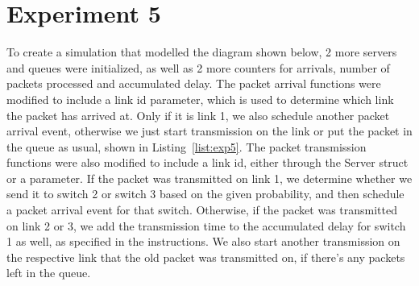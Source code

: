 \section*{Experiment 5}
To create a simulation that modelled the diagram shown below, 2 more servers and queues were initialized, as well as 2 more counters for arrivals, number of packets processed and accumulated delay.
The packet arrival functions were modified to include a link id parameter, which is used to determine which link the packet has arrived at.
Only if it is link 1, we also schedule another packet arrival event, otherwise we just start transmission on the link or put the packet in the queue as usual, shown in Listing~\ref{list:exp5}.
The packet transmission functions were also modified to include a link id, either through the Server struct or a parameter.
If the packet was transmitted on link 1, we determine whether we send it to switch 2 or switch 3 based on the given probability, and then schedule a packet arrival event for that switch.
Otherwise, if the packet was transmitted on link 2 or 3, we add the transmission time to the accumulated delay for switch 1 as well, as specified in the instructions.
We also start another transmission on the respective link that the old packet was transmitted on, if there's any packets left in the queue.

